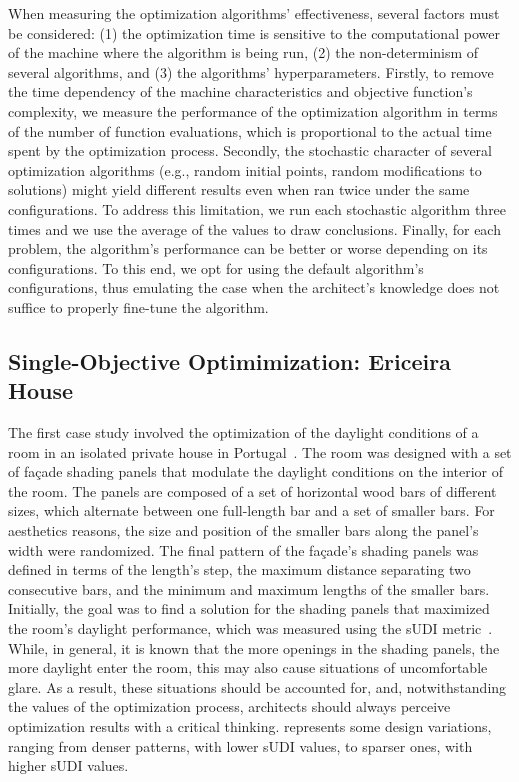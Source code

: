 When measuring the optimization algorithms' effectiveness, several factors must be considered: (1) the optimization time is sensitive to the computational power of the machine where the algorithm is being run, (2) the non-determinism of several algorithms, and (3) the algorithms' hyperparameters. Firstly, to remove the time dependency of the machine characteristics and objective function's complexity, we measure the performance of the optimization algorithm in terms of the number of function evaluations, which is proportional to the actual time spent by the optimization process. Secondly, the stochastic character of several optimization algorithms (e.g., random initial points, random modifications to solutions) might yield different results even when ran twice under the same configurations. To address this limitation, we run each stochastic algorithm three times and we use the average of the values to draw conclusions. Finally, for each problem, the algorithm's performance can be better or worse depending on its configurations. To this end, we opt for using the default algorithm's configurations, thus emulating the case when the architect's knowledge does not suffice to properly fine-tune the algorithm. 

\subsection{Single-Objective Optimimization: Ericeira House}
\label{ssec:soocasestudy}
The first case study involved the optimization of the daylight conditions of a room in an isolated private house in Portugal~\cite{Caetano2018,Belem2018optimizeddesign}. The room was designed with a set of façade shading panels that modulate the daylight conditions on the interior of the room. The panels are composed of a set of horizontal wood bars of different sizes, which alternate between one full-length bar and a set of smaller bars. For aesthetics reasons, the size and position of the smaller bars along the panel's width were randomized. The final pattern of the façade's shading panels was defined in terms of the length’s step, the maximum distance separating two consecutive bars, and the minimum and maximum lengths of the smaller bars. Initially, the goal was to find a solution for the shading panels that maximized the room's daylight performance, which was measured using the \ac{sUDI} metric~\cite{Nabil2006}. While, in general, it is known that the more openings in the shading panels, the more daylight enter the room, this may also cause situations of uncomfortable glare. As a result, these situations should be accounted for, and, notwithstanding the values of the optimization process, architects should always perceive optimization results with a critical thinking.  represents some design variations, ranging from denser patterns, with lower \ac{sUDI} values, to sparser ones, with higher \ac{sUDI} values.

